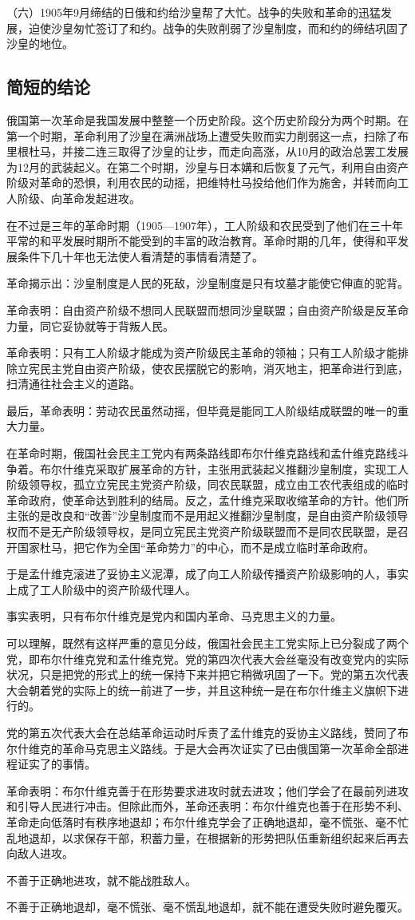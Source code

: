 （六）1905年9月缔结的日俄和约给沙皇帮了大忙。战争的失败和革命的迅猛发展，迫使沙皇匆忙签订了和约。战争的失败削弱了沙皇制度，而和约的缔结巩固了沙皇的地位。


\subsection{简短的结论}

俄国第一次革命是我国发展中整整一个历史阶段。这个历史阶段分为两个时期。在第一个时期，革命利用了沙皇在满洲战场上遭受失败而实力削弱这一点，扫除了布里根杜马，并接二连三取得了沙皇的让步，而走向高涨，从10月的政治总罢工发展为12月的武装起义。在第二个时期，沙皇与日本媾和后恢复了元气，利用自由资产阶级对革命的恐惧，利用农民的动摇，把维特杜马投给他们作为施舍，并转而向工人阶级、向革命发起进攻。

在不过是三年的革命时期（1905—1907年），工人阶级和农民受到了他们在三十年平常的和平发展时期所不能受到的丰富的政治教育。革命时期的几年，使得和平发展条件下几十年也无法使人看清楚的事情看清楚了。

革命揭示出：沙皇制度是人民的死敌，沙皇制度是只有坟墓才能使它伸直的驼背。

革命表明：自由资产阶级不想同人民联盟而想同沙皇联盟；自由资产阶级是反革命力量，同它妥协就等于背叛人民。

革命表明：只有工人阶级才能成为资产阶级民主革命的领袖；只有工人阶级才能排除立宪民主党自由资产阶级，使农民摆脱它的影响，消灭地主，把革命进行到底，扫清通往社会主义的道路。

最后，革命表明：劳动农民虽然动摇，但毕竟是能同工人阶级结成联盟的唯一的重大力量。

在革命时期，俄国社会民主工党内有两条路线即布尔什维克路线和孟什维克路线斗争着。布尔什维克采取扩展革命的方针，主张用武装起义推翻沙皇制度，实现工人阶级领导权，孤立立宪民主党资产阶级，同农民联盟，成立由工农代表组成的临时革命政府，使革命达到胜利的结局。反之，孟什维克采取收缩革命的方针。他们所主张的是改良和“改善”沙皇制度而不是用起义推翻沙皇制度，是自由资产阶级领导权而不是无产阶级领导权，是同立宪民主党资产阶级联盟而不是同农民联盟，是召开国家杜马，把它作为全国“革命势力”的中心，而不是成立临时革命政府。

于是孟什维克滚进了妥协主义泥潭，成了向工人阶级传播资产阶级影响的人，事实上成了工人阶级中的资产阶级代理人。

事实表明，只有布尔什维克是党内和国内革命、马克思主义的力量。

可以理解，既然有这样严重的意见分歧，俄国社会民主工党实际上已分裂成了两个党，即布尔什维克党和孟什维克党。党的第四次代表大会丝毫没有改变党内的实际状况，只是把党的形式上的统一保持下来并把它稍微巩固了一下。党的第五次代表大会朝着党的实际上的统一前进了一步，并且这种统一是在布尔什维主义旗帜下进行的。

党的第五次代表大会在总结革命运动时斥责了孟什维克的妥协主义路线，赞同了布尔什维克的革命马克思主义路线。于是大会再次证实了已由俄国第一次革命全部进程证实了的事情。

革命表明：布尔什维克善于在形势要求进攻时就去进攻；他们学会了在最前列进攻和引导人民进行冲击。但除此而外，革命还表明：布尔什维克也善于在形势不利、革命走向低落时有秩序地退却；布尔什维克学会了正确地退却，毫不慌张、毫不忙乱地退却，以求保存干部，积蓄力量，在根据新的形势把队伍重新组织起来后再去向敌人进攻。

不善于正确地进攻，就不能战胜敌人。

不善于正确地退却，毫不慌张、毫不慌乱地退却，就不能在遭受失败时避免覆灭。

